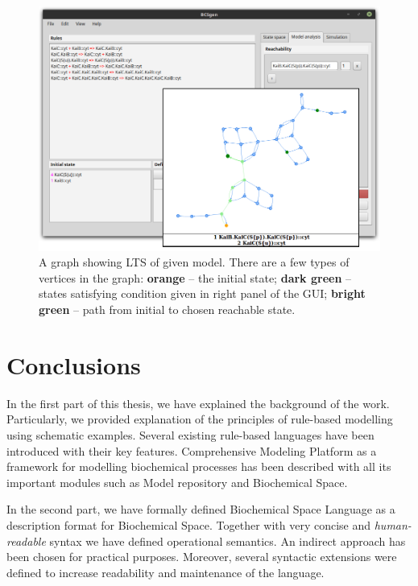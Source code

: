 \documentclass[12pt, twoside]{fithesis2} %
\begin{document}
\begin{figure}[!h]
\begin{center}
\includegraphics[scale=0.35]{pics/BCSgen_reach}
\caption{A graph showing LTS of given model. There are a few types of vertices in the graph: \textbf{orange} -- the initial state; \textbf{dark green} -- states satisfying condition given in right panel of the GUI; \textbf{bright green} -- path from initial to chosen reachable state.}\label{gui_reach}
\end{center}
\end{figure}

\chapter{Conclusions}

In the first part of this thesis, we have explained the background of the work. Particularly, we provided explanation of the principles of rule-based modelling using schematic examples. Several existing rule-based languages have been introduced with their key features. Comprehensive Modeling Platform as a framework for modelling biochemical processes has been described with all its important modules such as Model repository and Biochemical Space.

In the second part, we have formally defined Biochemical Space Language as a description format for Biochemical Space. Together with very concise and \emph{human-readable} syntax we have defined operational semantics. An indirect approach has been chosen for practical purposes. Moreover, several syntactic extensions were defined to increase readability and maintenance of the language.
\end{document}
